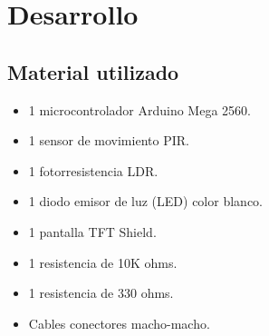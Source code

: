 \documentclass[conference]{IEEEtran}
\begin{document}
\section{Desarrollo}

\subsection{Material utilizado}
\begin{itemize}
  \item 1 microcontrolador Arduino Mega 2560.
  \item 1 sensor de movimiento PIR.
  \item 1 fotorresistencia LDR.
  \item 1 diodo emisor de luz (LED) color blanco.
  \item 1 pantalla TFT Shield.
  \item 1 resistencia de 10K ohms.
  \item 1 resistencia de 330 ohms. 
  \item Cables conectores macho-macho.
\end{itemize}
\end{document}

